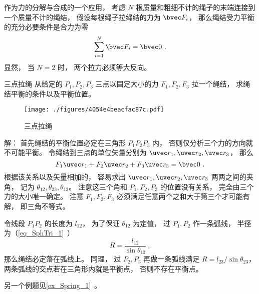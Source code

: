 

作为力的分解与合成的一个应用， 考虑 $N$ 根质量和粗细不计的绳子的末端连接到一个质量不计的绳结， 假设每根绳子拉绳结的力为 $\bvec F_i$， 那么绳结受力平衡的充分必要条件是合力为零
\begin{equation}
\sum_{i=1}^N \bvec F_i = \bvec 0~.
\end{equation}
显然， 当 $N = 2$ 时， 两个拉力必须等大反向。

\begin{example}{三点拉绳}
从给定的 $P_1,P_2,P_3$ 三点以固定大小的力 $F_1, F_2, F_3$ 拉一个绳结， 求绳结平衡的条件以及平衡位置。
\begin{figure}[ht]
\centering
\texttt{[image: ./figures/4054e4beacfac87c.pdf]}
\caption{三点拉绳} \label{fig_Knot_1}
\end{figure}

解： 首先绳结的平衡位置必定在三角形 $P_1 P_2 P_3$ 内， 否则仅分析三个力的方向就不可能平衡。 令绳结到三点的单位矢量分别为 $\uvec r_1, \uvec r_2, \uvec r_3$， 那么
\begin{equation}
F_1 \uvec r_1 + F_2 \uvec r_2 + F_3 \uvec r_3 = \bvec 0~.
\end{equation}
根据该关系以及矢量相加的， 容易求出 $\uvec r_1, \uvec r_2, \uvec r_3$ 两两之间的夹角， 记为 $\theta_{12}, \theta_{23}, \theta_{13}$。 注意这三个角和 $P_1, P_2, P_3$ 的位置没有关系， 完全由三个力的大小唯一确定。 注意 $F_1, F_2, F_3$ 必须满足任意两个之和大于第三个才可能有解， 即三角不等式。

令线段 $P_1P_2$ 的长度为 $l_{12}$， 为了保证 $\theta_{12}$ 为定值， 过 $P_1, P_2$ 作一条弧线， 半径为（\autoref{eq_SphTri_1}~）
\begin{equation}
R = \frac{l_{12}}{\sin\theta_{12}}~,
\end{equation}
那么绳结必定落在弧线上。 同理， 过 $P_2, P_3$ 再做一条弧线满足 $R = l_{23}/\sin\theta_{23}$， 两条弧线的交点若在三角形内就是平衡点， 否则不存在平衡点。
\end{example}

另一个例题见\autoref{ex_Spring_1}~。
